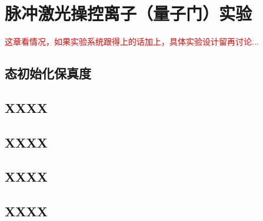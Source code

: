 
\chapter[脉冲激光操控离子（量子门）实验]{脉冲激光操控离子（量子门）实验}

\textcolor{red}{
这章看情况，如果实验系统跟得上的话加上，具体实验设计留再讨论...
}

\section[态初始化保真度]{态初始化保真度}

\section[XXXX]{XXXX}

\section[XXXX]{XXXX}

\section[XXXX]{XXXX}

\section[XXXX]{XXXX}

